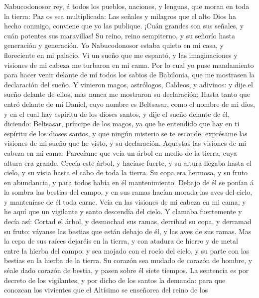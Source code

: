  Nabucodonosor rey, á todos los pueblos, naciones, y
lenguas, que moran en toda la tierra: Paz os sea multiplicada:
 Las señales y milagros que el alto Dios ha hecho conmigo,
conviene que yo las publique.  ¡Cuán grandes son sus
señales, y cuán potentes sus maravillas! Su reino, reino sempiterno, y
su señorío hasta generación y generación.  Yo
Nabucodonosor estaba quieto en mi casa, y floreciente en mi palacio.
 Vi un sueño que me espantó, y las imaginaciones y
visiones de mi cabeza me turbaron en mi cama.  Por lo cual
yo puse mandamiento para hacer venir delante de mí todos los sabios de
Babilonia, que me mostrasen la declaración del sueño.  Y
vinieron magos, astrólogos, Caldeos, y adivinos: y dije el sueño delante
de ellos, mas nunca me mostraron su declaración;  Hasta
tanto que entró delante de mí Daniel, cuyo nombre es Beltsasar, como el
nombre de mi dios, y en el cual hay espíritu de los dioses santos, y
dije el sueño delante de él, diciendo:  Beltsasar,
príncipe de los magos, ya que he entendido que hay en ti espíritu de los
dioses santos, y que ningún misterio se te esconde, exprésame las
visiones de mi sueño que he visto, y su declaración. 
Aquestas las visiones de mi cabeza en mi cama: Parecíame que veía un
árbol en medio de la tierra, cuya altura era grande. 
Crecía este árbol, y hacíase fuerte, y su altura llegaba hasta el cielo,
y su vista hasta el cabo de toda la tierra.  Su copa era
hermosa, y su fruto en abundancia, y para todos había en él
mantenimiento. Debajo de él se ponían á la sombra las bestias del campo,
y en sus ramas hacían morada las aves del cielo, y manteníase de él toda
carne.  Veía en las visiones de mi cabeza en mi cama, y
he aquí que un vigilante y santo descendía del cielo.  Y
clamaba fuertemente y decía así: Cortad el árbol, y desmochad sus ramas,
derribad su copa, y derramad su fruto: váyanse las bestias que están
debajo de él, y las aves de sus ramas.  Mas la cepa de
sus raíces dejaréis en la tierra, y con atadura de hierro y de metal
entre la hierba del campo; y sea mojado con el rocío del cielo, y su
parte con las bestias en la hierba de la tierra.  Su
corazón sea mudado de corazón de hombre, y séale dado corazón de bestia,
y pasen sobre él siete tiempos.  La sentencia es por
decreto de los vigilantes, y por dicho de los santos la demanda: para
que conozcan los vivientes que el Altísimo se enseñorea del reino de los
